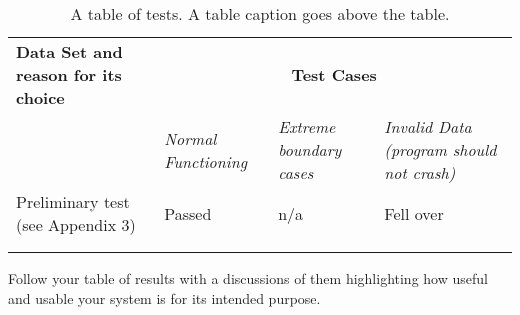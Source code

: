 \begin{table}[h!]
  \centering
\caption{A table of tests. A table caption goes above the table.}

  \begin{tabular}[t]{|p{5.5cm}|p{3cm}|p{3cm}|p{3cm}|} \hline \textbf{Data Set
    and reason for its choice} & \multicolumn{3}{c|}{\textbf{Test Cases}}\\
    \cline{2-4} & \emph{Normal Functioning} & \emph{Extreme boundary cases} &
    \emph{Invalid Data (program should not crash)} \\ \hline Preliminary test
    (see Appendix 3) & Passed & n/a & Fell over \\\hline &&&\\ \hline
    &&&\\ \hline
  \end{tabular}

\label{tab:tests}
\end{table}

Follow your table of results with a discussions of them highlighting
how useful and usable your system is for its intended purpose.

